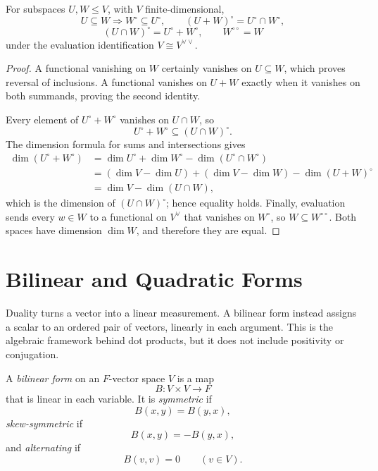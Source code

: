\begin{proposition}\label{prop:annihilator-identities}
For subspaces \(U,W\leq V\), with \(V\) finite-dimensional,
\[
U\subseteq W\Longrightarrow W^\circ\subseteq U^\circ,
\qquad
(U+W)^\circ=U^\circ\cap W^\circ,
\]
\[
(U\cap W)^\circ=U^\circ+W^\circ,
\qquad
W^{\circ\circ}=W
\]
under the evaluation identification \(V\cong V^{\vee\vee}\).
\end{proposition}
\begin{proof}
A functional vanishing on \(W\) certainly vanishes on \(U\subseteq W\),
which proves reversal of inclusions.  A functional vanishes on \(U+W\)
exactly when it vanishes on both summands, proving the second identity.

Every element of \(U^\circ+W^\circ\) vanishes on \(U\cap W\), so
\[
U^\circ+W^\circ\subseteq(U\cap W)^\circ.
\]
The dimension formula for sums and intersections gives
\[
\begin{aligned}
\dim(U^\circ+W^\circ)
&=\dim U^\circ+\dim W^\circ-\dim(U^\circ\cap W^\circ)\\
&=(\dim V-\dim U)+(\dim V-\dim W)-\dim(U+W)^\circ\\
&=\dim V-\dim(U\cap W),
\end{aligned}
\]
which is the dimension of \((U\cap W)^\circ\); hence equality holds.
Finally, evaluation sends every \(w\in W\) to a functional on \(V^\vee\)
that vanishes on \(W^\circ\), so \(W\subseteq W^{\circ\circ}\).  Both spaces
have dimension \(\dim W\), and therefore they are equal.
\end{proof}

\section{Bilinear and Quadratic Forms}\label{sec:bilinear-quadratic-forms}
Duality turns a vector into a linear measurement.  A bilinear form instead
assigns a scalar to an ordered pair of vectors, linearly in each argument.
This is the algebraic framework behind dot products, but it does not include
positivity or conjugation.

\begin{definition}
A \emph{bilinear form} on an \(F\)-vector space \(V\) is a map
\[
B:V\times V\longrightarrow F
\]
that is linear in each variable.  It is \emph{symmetric} if
\[
B(x,y)=B(y,x),
\]
\emph{skew-symmetric} if
\[
B(x,y)=-B(y,x),
\]
and \emph{alternating} if
\[
B(v,v)=0
\qquad(v\in V).
\]
\end{definition}

